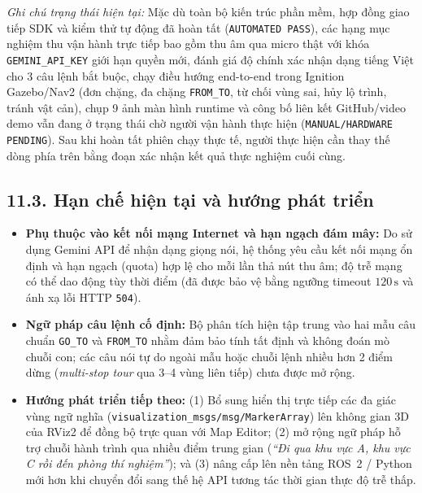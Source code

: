 \pending{}

\textit{Ghi chú trạng thái hiện tại:} Mặc dù toàn bộ kiến trúc phần mềm, hợp đồng giao tiếp SDK và kiểm thử tự động đã hoàn tất (\texttt{AUTOMATED PASS}), các hạng mục nghiệm thu vận hành trực tiếp bao gồm thu âm qua micro thật với khóa \texttt{GEMINI\_API\_KEY} giới hạn quyền mới, đánh giá độ chính xác nhận dạng tiếng Việt cho 3 câu lệnh bắt buộc, chạy điều hướng end-to-end trong Ignition Gazebo/Nav2 (đơn chặng, đa chặng \texttt{FROM\_TO}, từ chối vùng sai, hủy lộ trình, tránh vật cản), chụp 9 ảnh màn hình runtime và công bố liên kết GitHub/video demo vẫn đang ở trạng thái chờ người vận hành thực hiện (\texttt{MANUAL/HARDWARE PENDING}). Sau khi hoàn tất phiên chạy thực tế, người thực hiện cần thay thế dòng \pending{} phía trên bằng đoạn xác nhận kết quả thực nghiệm cuối cùng.

\subsection*{11.3. Hạn chế hiện tại và hướng phát triển}

\begin{itemize}[leftmargin=1.2cm]
  \item \textbf{Phụ thuộc vào kết nối mạng Internet và hạn ngạch đám mây:} Do sử dụng Gemini API để nhận dạng giọng nói, hệ thống yêu cầu kết nối mạng ổn định và hạn ngạch (quota) hợp lệ cho mỗi lần thả nút thu âm; độ trễ mạng có thể dao động tùy thời điểm (đã được bảo vệ bằng ngưỡng timeout $120\,\text{s}$ và ánh xạ lỗi HTTP \texttt{504}).
  \item \textbf{Ngữ pháp câu lệnh cố định:} Bộ phân tích hiện tập trung vào hai mẫu câu chuẩn \texttt{GO\_TO} và \texttt{FROM\_TO} nhằm đảm bảo tính tất định và không đoán mò chuỗi con; các câu nói tự do ngoài mẫu hoặc chuỗi lệnh nhiều hơn 2 điểm dừng (\textit{multi-stop tour} qua 3--4 vùng liên tiếp) chưa được mở rộng.
  \item \textbf{Hướng phát triển tiếp theo:} (1) Bổ sung hiển thị trực tiếp các đa giác vùng ngữ nghĩa (\texttt{visualization\_msgs/msg/MarkerArray}) lên không gian 3D của RViz2 để đồng bộ trực quan với Map Editor; (2) mở rộng ngữ pháp hỗ trợ chuỗi hành trình qua nhiều điểm trung gian (\textit{``Đi qua khu vực A, khu vực C rồi đến phòng thí nghiệm''}); và (3) nâng cấp lên nền tảng ROS~2 / Python mới hơn khi chuyển đổi sang thế hệ API tương tác thời gian thực độ trễ thấp.
\end{itemize}

